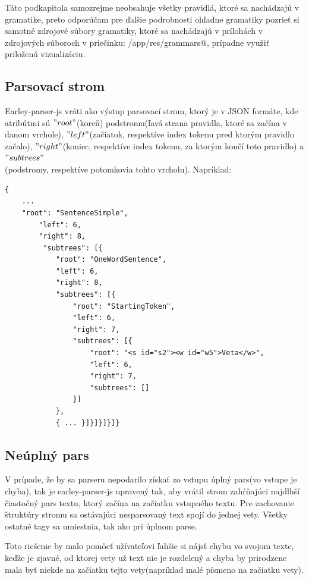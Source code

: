 \documentclass[12pt,a4paper]{report}
\theoremstyle{definition}
\theoremstyle{remark}
\begin{document}
\newpage
Táto podkapitola samozrejme neobsahuje všetky pravidlá, ktoré sa nachádzajú v gramatike, preto odporúčam pre ďalšie podrobnosti ohľadne gramatiky pozrieť si samotné zdrojové súbory gramatiky, ktoré sa nachádzajú v prílohách v zdrojových súboroch v priečinku: \verb@parser/app/res/grammars@, prípadne využiť priloženú vizualizáciu.


\subsection{Parsovací strom}
Earley-parser-js vráti ako výstup parsovací strom, ktorý je v JSON formáte, kde atribútmi sú $"root"$(koreň) podstromu(ľavá strana pravidla, ktoré sa začína v danom vrchole), $"left"$(začiatok, respektíve index tokenu pred ktorým pravidlo začalo), $"right"$(koniec, respektíve index tokenu, za ktorým končí toto pravidlo) a $"subtrees"$ \\ (podstromy, respektíve potomkovia tohto vrcholu). Napríklad: 
\begin{lstlisting}[style=htmlcssjs, basicstyle=\fontsize{9}{11}\ttfamily]
 {
 	...
	"root": "SentenceSimple",
		"left": 6,
		"right": 8,
		 "subtrees": [{
			"root": "OneWordSentence",
			"left": 6,
			"right": 8,
			"subtrees": [{
				"root": "StartingToken",
				"left": 6,
				"right": 7,
				"subtrees": [{
					"root": "<s id="s2"><w id="w5">Veta</w>",
					"left": 6,
					"right": 7,
					"subtrees": []
				}]
			},
			{ ... }]}]}]}]}
\end{lstlisting}




\subsection{Neúplný pars}
V prípade, že by sa parseru nepodarilo získať zo vstupu úplný pars(vo vstupe je chyba), tak je earley-parser-js upravený tak, aby vrátil strom zahŕňajúci najdlhší čiastočný pars textu, ktorý začína na začiatku vstupného textu. Pre zachovanie štruktúry stromu sa ostávajúci nesparsovaný text spojí do jednej vety. Všetky ostatné tagy sa umiestnia, tak ako pri úplnom parse.

Toto riešenie by malo pomôcť užívateľovi ľahšie si nájsť chybu vo svojom texte, keďže je zjavné, od ktorej vety už text nie je rozdelený a chyba by prirodzene mala byť niekde na začiatku tejto vety(napríklad malé písmeno na začiatku vety).
\end{document}
